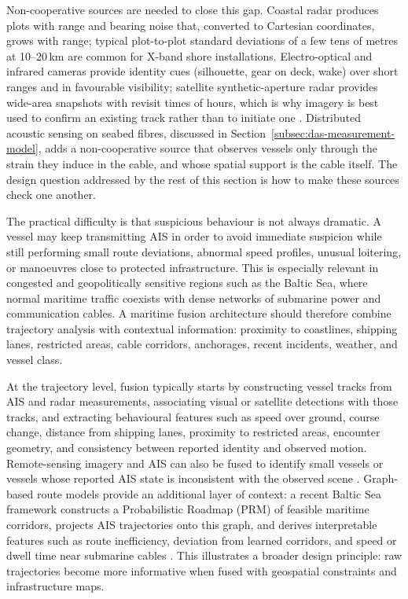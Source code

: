 Non-cooperative sources are needed to close this gap. Coastal radar produces plots with range and bearing noise that, converted to Cartesian coordinates, grows with range; typical plot-to-plot standard deviations of a few tens of metres at 10--20\,km are common for X-band shore installations. Electro-optical and infrared cameras provide identity cues (silhouette, gear on deck, wake) over short ranges and in favourable visibility; satellite synthetic-aperture radar provides wide-area snapshots with revisit times of hours, which is why imagery is best used to confirm an existing track rather than to initiate one \cite{chen_sviadf_2025}. Distributed acoustic sensing on seabed fibres, discussed in Section~\ref{subsec:das-measurement-model}, adds a non-cooperative source that observes vessels only through the strain they induce in the cable, and whose spatial support is the cable itself. The design question addressed by the rest of this section is how to make these sources check one another.


The practical difficulty is that suspicious behaviour is not always dramatic. A vessel may keep transmitting AIS in order to avoid immediate suspicion while still performing small route deviations, abnormal speed profiles, unusual loitering, or manoeuvres close to protected infrastructure. This is especially relevant in congested and geopolitically sensitive regions such as the Baltic Sea, where normal maritime traffic coexists with dense networks of submarine power and communication cables. A maritime fusion architecture should therefore combine trajectory analysis with contextual information: proximity to coastlines, shipping lanes, restricted areas, cable corridors, anchorages, recent incidents, weather, and vessel class.

At the trajectory level, fusion typically starts by constructing vessel tracks from AIS and radar measurements, associating visual or satellite detections with those tracks, and extracting behavioural features such as speed over ground, course change, distance from shipping lanes, proximity to restricted areas, encounter geometry, and consistency between reported identity and observed motion. Remote-sensing imagery and AIS can also be fused to identify small vessels or vessels whose reported AIS state is inconsistent with the observed scene \cite{chen_sviadf_2025}. Graph-based route models provide an additional layer of context: a recent Baltic Sea framework constructs a Probabilistic Roadmap (PRM) of feasible maritime corridors, projects AIS trajectories onto this graph, and derives interpretable features such as route inefficiency, deviation from learned corridors, and speed or dwell time near submarine cables \cite{oliva_tomei_prm_access_2026}. This illustrates a broader design principle: raw trajectories become more informative when fused with geospatial constraints and infrastructure maps.
